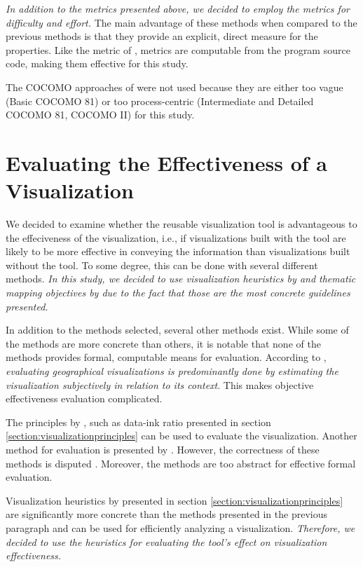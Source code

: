 \emph{In addition to the metrics presented above, we decided to employ the \citeauthor{halstead_elements_1977} metrics for difficulty and effort.} The main advantage of these methods when compared to the previous methods is that they provide an explicit, direct measure for the properties. Like the metric of \citeauthor{mccabe_complexity_1976}, \citeauthor{halstead_elements_1977} metrics are computable from the program source code, making them effective for this study.

The COCOMO approaches of \citet{boehm_software_1981} were not used because they are either too vague (Basic COCOMO 81) or too process-centric (Intermediate and Detailed COCOMO 81, COCOMO II) for this study.

\section{Evaluating the Effectiveness of a Visualization}

We decided to examine whether the reusable visualization tool is advantageous to the effeciveness of the visualization, i.e., if visualizations built with the tool are likely to be more effective in conveying the information than visualizations built without the tool. To some degree, this can be done with several different methods. \emph{In this study, we decided to use visualization heuristics by \citet{zuk_heuristics_2006} and thematic mapping objectives by \citet{schlichtmann_visualization_2002} due to the fact that those are the most concrete guidelines presented.}

In addition to the methods selected, several other methods exist. While some of the methods are more concrete than others, it is notable that none of the methods provides formal, computable means for evaluation. According to \citet{kraak_cartographic_1998}, \emph{evaluating geographical visualizations is predominantly done by estimating the visualization subjectively in relation to its context}. This makes objective effectiveness evaluation complicated.

The principles by \citet{tufte_visual_1986}, such as data-ink ratio presented in section \ref{section:visualizationprinciples} can be used to evaluate the visualization. Another method for evaluation is presented by \citet{azzam_j-b_2013}. However, the correctness of these methods is disputed \citep{kosslyn_graphics_1985,inbar_minimalism_2007}. Moreover, the methods are too abstract for effective formal evaluation.

Visualization heuristics by \citet{zuk_heuristics_2006} presented in section \ref{section:visualizationprinciples} are significantly more concrete than the methods presented in the previous paragraph and can be used for efficiently analyzing a visualization. \emph{Therefore, we decided to use the heuristics for evaluating the tool's effect on visualization effectiveness.}

